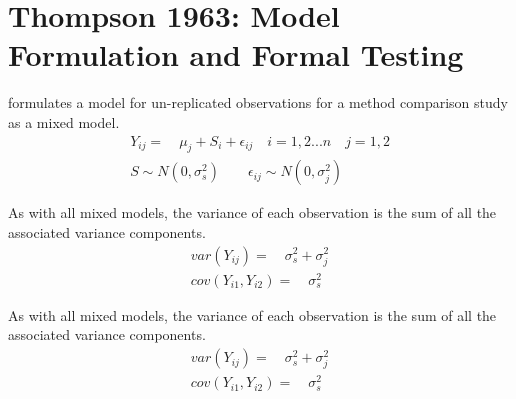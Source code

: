 \documentclass[12pt, a4paper]{report}
\theoremstyle{plain}
\theoremstyle{definition}
\theoremstyle{remark}
\begin{document}














\section{Thompson 1963: Model Formulation and Formal Testing}

\citet{Kinsella} formulates a model for un-replicated observations
for a method comparison study as a mixed model.
\begin{eqnarray}
Y_{ij} =\quad \mu_{j} + S_{i} + \epsilon_{ij} \quad i=1,2...n\quad
j=1,2\\
S \sim N(0,\sigma^{2}_{s})\qquad \epsilon_{ij} \sim
N(0,\sigma^{2}_{j}) \nonumber
\end{eqnarray}

As with all mixed models, the variance of each observation is the
sum of all the associated variance components.
\begin{eqnarray}
var(Y_{ij}) =\quad \sigma^{2}_{s} + \sigma^{2}_{j} \\
cov(Y_{i1},Y_{i2})=\quad \sigma^{2}_{s} \nonumber
\end{eqnarray}

As with all mixed models, the variance of each observation is the sum of all the associated variance components.
\begin{eqnarray}
var(Y_{ij}) =\quad \sigma^{2}_{s} + \sigma^{2}_{j} \\
cov(Y_{i1},Y_{i2})=\quad \sigma^{2}_{s} \nonumber
\end{eqnarray}
\end{document}

